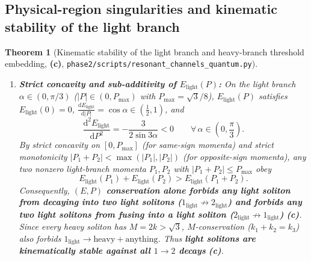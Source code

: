 \documentclass[11pt,a4paper]{article}
\newcommand{\Lc}{\textsf{\textbf{(c)}}\xspace}
\newcommand{\dd}{\mathrm{d}}
\newcommand{\squant}{\texttt{phase2/\allowbreak scripts/\allowbreak resonant\_\allowbreak channels\_\allowbreak quantum.py}}
\newtheorem{theorem}[proposition]{Theorem}
\theoremstyle{remark}
\begin{document}
\subsection{Physical-region singularities and kinematic stability of the light branch}

\begin{theorem}[Kinematic stability of the light branch and heavy-branch threshold embedding, \Lc, \squant]\label{thm:light_stability}
\mbox{}
\begin{enumerate}
\item \textbf{Strict concavity and sub-additivity of $E_{\mathrm{light}}(P)$:}
On the light branch $\alpha \in (0,\pi/3)$ ($|P| \in (0,P_{\max})$ with
$P_{\max} = \sqrt{3}/8$), $E_{\mathrm{light}}(P)$ satisfies $E_{\mathrm{light}}(0)=0$,
$\frac{\dd E_{\mathrm{light}}}{\dd|P|} = \cos\alpha \in (\frac{1}{2},1)$, and
\begin{equation}\label{eq:d2E_dP2}
  \frac{\dd^2 E_{\mathrm{light}}}{\dd P^2} = -\frac{3}{2\sin 3\alpha} < 0
  \qquad \forall\,\alpha \in \left(0,\frac{\pi}{3}\right).
\end{equation}
By strict concavity on $[0,P_{\max}]$ (for same-sign momenta) and strict
monotonicity $|P_1+P_2| < \max(|P_1|,|P_2|)$ (for opposite-sign momenta), any
two nonzero light-branch momenta $P_1,P_2$ with $|P_1+P_2| \le P_{\max}$ obey
\begin{equation}\label{eq:subadditivity}
  \boxed{\;
  E_{\mathrm{light}}(P_1) + E_{\mathrm{light}}(P_2) > E_{\mathrm{light}}(P_1 + P_2).
  \;}
\end{equation}
Consequently, \textbf{$(E,P)$ conservation alone forbids any light soliton from
decaying into two light solitons ($1_{\mathrm{light}}\not\to 2_{\mathrm{light}}$)
and forbids any two light solitons from fusing into a light soliton
($2_{\mathrm{light}}\not\to 1_{\mathrm{light}}$)} \Lc. Since every heavy soliton
has $M = 2k > \sqrt{3}$, $M$-conservation ($k_1+k_2=k_3$) also forbids
$1_{\mathrm{light}}\to\text{heavy}+\text{anything}$. Thus \textbf{light solitons
are kinematically stable against all $1\to 2$ decays} \Lc.


\end{enumerate}
\end{theorem}
\end{document}
